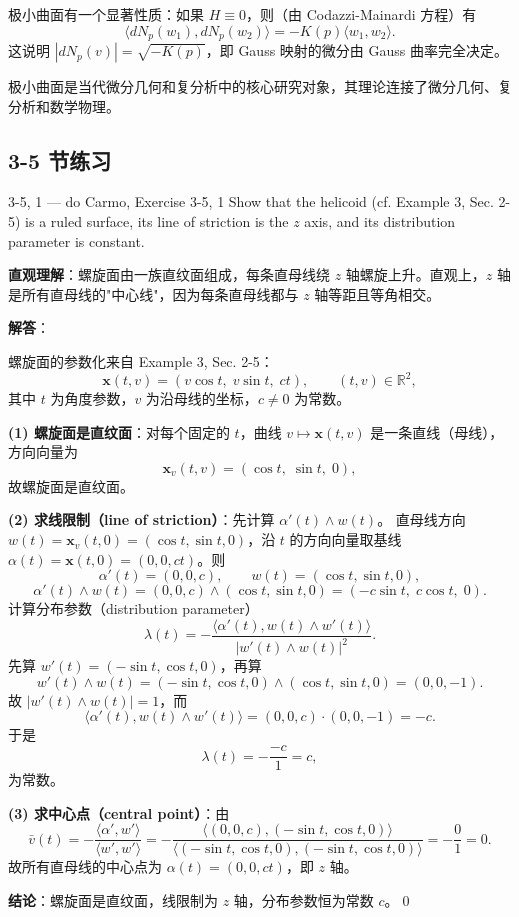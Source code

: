极小曲面有一个显著性质：如果 $H \equiv 0$，则（由 Codazzi-Mainardi 方程）有
\[
\langle dN_p(w_1), dN_p(w_2)\rangle = -K(p)\langle w_1, w_2\rangle.
\tag{3-5-2}
\]
这说明 $|dN_p(v)| = \sqrt{-K(p)}$，即 Gauss 映射的微分由 Gauss 曲率完全决定。

极小曲面是当代微分几何和复分析中的核心研究对象，其理论连接了微分几何、复分析和数学物理。

\subsection*{3-5 节练习}

\begin{exercise}{3-5, 1 — do Carmo, Exercise 3-5, 1}
Show that the helicoid (cf. Example 3, Sec. 2-5) is a ruled surface, its line of striction is the $z$ axis, and its distribution parameter is constant.
\end{exercise}

\begin{solution}
\textbf{直观理解}：螺旋面由一族直纹面组成，每条直母线绕 $z$ 轴螺旋上升。直观上，$z$ 轴是所有直母线的"中心线"，因为每条直母线都与 $z$ 轴等距且等角相交。

\textbf{解答}：

螺旋面的参数化来自 Example 3, Sec. 2-5：
\[
\mathbf{x}(t,v) = (v\cos t,\; v\sin t,\; ct),\qquad (t,v)\in\mathbb{R}^2,
\]
其中 $t$ 为角度参数，$v$ 为沿母线的坐标，$c\neq 0$ 为常数。

\textbf{(1) 螺旋面是直纹面}：对每个固定的 $t$，曲线 $v\mapsto \mathbf{x}(t,v)$ 是一条直线（母线），方向向量为
\[
\mathbf{x}_v(t,v) = (\cos t,\; \sin t,\; 0),
\]
故螺旋面是直纹面。

\textbf{(2) 求线限制（line of striction）}：先计算 $\alpha'(t)\wedge w(t)$。
直母线方向 $w(t)=\mathbf{x}_v(t,0)=(\cos t,\sin t,0)$，沿 $t$ 的方向向量取基线 $\alpha(t)=\mathbf{x}(t,0)=(0,0,ct)$。则
\[
\alpha'(t) = (0,0,c),\qquad w(t)=(\cos t,\sin t,0),
\]
\[
\alpha'(t)\wedge w(t) = (0,0,c)\wedge(\cos t,\sin t,0) = (-c\sin t,\; c\cos t,\; 0).
\]
计算分布参数（distribution parameter）
\[
\lambda(t) = -\frac{\langle \alpha'(t), w(t)\wedge w'(t)\rangle}{|w'(t)\wedge w(t)|^2}.
\]
先算 $w'(t)=(-\sin t,\cos t,0)$，再算
\[
w'(t)\wedge w(t) = (-\sin t,\cos t,0)\wedge(\cos t,\sin t,0) = (0,0,-1).
\]
故 $|w'(t)\wedge w(t)|=1$，而
\[
\langle \alpha'(t), w(t)\wedge w'(t)\rangle = (0,0,c)\cdot(0,0,-1) = -c.
\]
于是
\[
\lambda(t) = -\frac{-c}{1}=c,
\]
为常数。

\textbf{(3) 求中心点（central point）}：由
\[
\bar{v}(t) = -\frac{\langle \alpha', w'\rangle}{\langle w', w'\rangle}
= -\frac{\langle (0,0,c),(-\sin t,\cos t,0)\rangle}{\langle(-\sin t,\cos t,0),(-\sin t,\cos t,0)\rangle}
= -\frac{0}{1}=0.
\]
故所有直母线的中心点为 $\alpha(t)=(0,0,ct)$，即 $z$ 轴。

\textbf{结论}：螺旋面是直纹面，线限制为 $z$ 轴，分布参数恒为常数 $c$。\qed
\end{solution}

